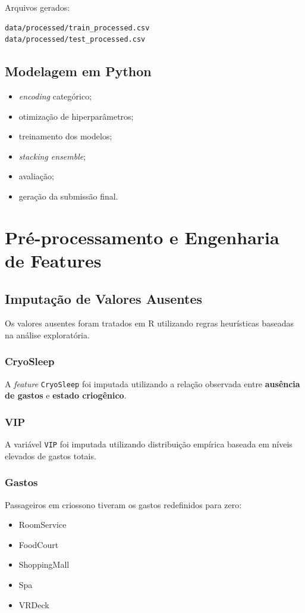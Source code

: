\documentclass[12pt,a4paper]{article}
\begin{document}
Arquivos gerados:

\begin{verbatim}
data/processed/train_processed.csv
data/processed/test_processed.csv
\end{verbatim}
\subsection{Modelagem em Python}
\label{sec:org1396ba2}
\begin{itemize}
\item \emph{encoding} categórico;
\item otimização de hiperparâmetros;
\item treinamento dos modelos;
\item \emph{stacking ensemble};
\item avaliação;
\item geração da submissão final.
\end{itemize}
\section{Pré-processamento e Engenharia de Features}
\label{sec:org09e5664}
\subsection{Imputação de Valores Ausentes}
\label{sec:org193da89}
Os valores ausentes foram tratados em R utilizando regras heurísticas
baseadas na análise exploratória.
\subsubsection{CryoSleep}
\label{sec:org432a181}
A \emph{feature} \texttt{CryoSleep} foi imputada utilizando a relação observada entre \textbf{ausência de gastos} e \textbf{estado criogênico}.
\subsubsection{VIP}
\label{sec:org9e8efda}
A variável \texttt{VIP} foi imputada utilizando distribuição empírica baseada em níveis elevados de gastos totais.
\subsubsection{Gastos}
\label{sec:orgdc81af9}
Passageiros em criossono tiveram os gastos redefinidos para zero:

\begin{itemize}
\item RoomService
\item FoodCourt
\item ShoppingMall
\item Spa
\item VRDeck
\end{itemize}
\end{document}
